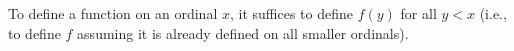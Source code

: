To define a function on an ordinal $x$, it suffices to define $f(y)$ for all $y < x$ (i.e., to define $f$ assuming it is already defined on all smaller ordinals).
